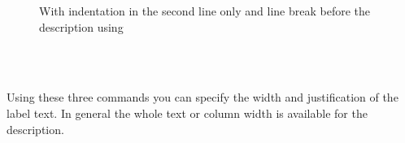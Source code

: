 \begin{Example}
\begin{figure}
    \vspace*{2ex}\noindent%
    \begin{minipage}{.9\linewidth}
      \begin{minipage}[t]{.48\linewidth}\sloppy
        \setcapindent*{1em}
        \caption[Example for a figure caption]%
        {With hanging indentation starting at the second line and line
          break before the description using
          \PParameter{1em}}
      \end{minipage}
      \hspace{.02\linewidth}
      \begin{minipage}[t]{.48\linewidth}\sloppy
        \setcapindent{-1em}
        \caption[Example for a figure caption]%
        {With indentation in the second line only and line break
          before the description using
          \PParameter{-1em}}
                \label{fig:maincls.caption.last}
      \end{minipage}
    \end{minipage}
  \end{figure}
\end{Example}
%
%
%
%


\begin{Declaration}
  \\
  \\
\end{Declaration}
%
%
%
Using these three
commands you can specify the width and justification of the label
text.  In general the whole text or column width is available for the
description.

